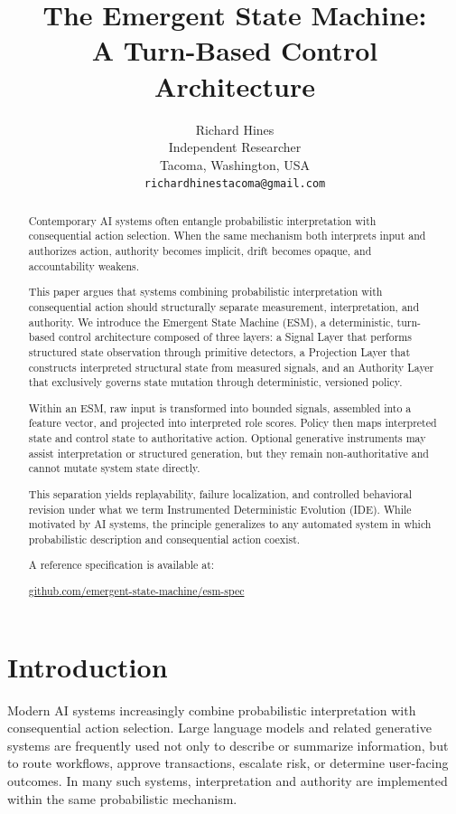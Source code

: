 \documentclass[11pt]{article}
\date{}
\title{The Emergent State Machine:\\
A Turn-Based Control Architecture}
\author{
Richard Hines\\
\small Independent Researcher\\
\small Tacoma, Washington, USA\\
\small \texttt{richardhinestacoma@gmail.com}\\
}
\begin{document}
\maketitle

\begin{abstract}

Contemporary AI systems often entangle probabilistic interpretation with consequential action selection. When the same mechanism both interprets input and authorizes action, authority becomes implicit, drift becomes opaque, and accountability weakens.

This paper argues that systems combining probabilistic interpretation with consequential action should structurally separate measurement, interpretation, and authority. We introduce the Emergent State Machine (ESM), a deterministic, turn-based control architecture composed of three layers: a Signal Layer that performs structured state observation through primitive detectors, a Projection Layer that constructs interpreted structural state from measured signals, and an Authority Layer that exclusively governs state mutation through deterministic, versioned policy.

Within an ESM, raw input is transformed into bounded signals, assembled into a feature vector, and projected into interpreted role scores. Policy then maps interpreted state and control state to authoritative action. Optional generative instruments may assist interpretation or structured generation, but they remain non-authoritative and cannot mutate system state directly.

This separation yields replayability, failure localization, and controlled behavioral revision under what we term Instrumented Deterministic Evolution (IDE). While motivated by AI systems, the principle generalizes to any automated system in which probabilistic description and consequential action coexist.

A reference specification is available at:

\href{https://github.com/emergent-state-machine/esm-spec}{github.com/emergent-state-machine/esm-spec}

\end{abstract}



\section{Introduction}
Modern AI systems increasingly combine probabilistic interpretation with consequential action selection. Large language models and related generative systems are frequently used not only to describe or summarize information, but to route workflows, approve transactions, escalate risk, or determine user-facing outcomes. In many such systems, interpretation and authority are implemented within the same probabilistic mechanism.
\end{document}
